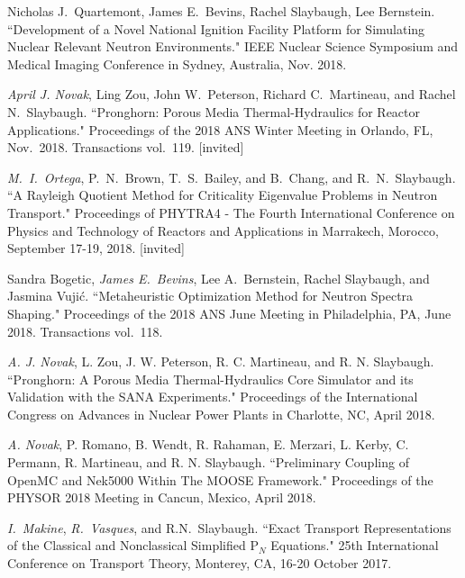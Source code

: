 \begin{bibsection}
\item Nicholas J.\ Quartemont, James E.\ Bevins, Rachel Slaybaugh, Lee Bernstein. ``Development of a Novel National Ignition Facility Platform for Simulating Nuclear Relevant Neutron Environments." IEEE Nuclear Science Symposium and Medical Imaging Conference in Sydney, Australia, Nov. 2018. 

\item \textit{April J. Novak}, Ling Zou, John W.\ Peterson, Richard C.\ Martineau, and Rachel N.\ Slaybaugh. ``Pronghorn: Porous Media Thermal-Hydraulics for Reactor Applications." Proceedings of the 2018 ANS Winter Meeting in Orlando, FL, Nov.\ 2018. Transactions vol.\ 119. [invited]

\item \textit{M.\ I.\ Ortega}, P.\ N.\ Brown, T.\ S.\ Bailey, and B.\ Chang, and R.\ N.\ Slaybaugh. ``A Rayleigh Quotient Method for Criticality Eigenvalue Problems in Neutron Transport." Proceedings of PHYTRA4 - The Fourth International Conference on Physics and Technology of Reactors and Applications in Marrakech, Morocco, September 17-19, 2018. [invited]

\item Sandra Bogetic, \textit{James E.\ Bevins}, Lee A.\ Bernstein, Rachel Slaybaugh, and Jasmina Vuji\'c. ``Metaheuristic Optimization Method for Neutron Spectra Shaping." Proceedings of the 2018 ANS June Meeting in Philadelphia, PA, June 2018. Transactions vol.\ 118. 

\item \textit{A. J. Novak}, L. Zou, J. W. Peterson, R. C. Martineau, and R. N. Slaybaugh.
``Pronghorn: A Porous Media Thermal-Hydraulics Core Simulator and its Validation with the SANA Experiments." Proceedings of the International Congress on Advances in Nuclear Power Plants in Charlotte, NC, April 2018. 

\item \textit{A. Novak}, P. Romano, B. Wendt, R. Rahaman, E. Merzari, L. Kerby, C. Permann, R. Martineau, and R. N. Slaybaugh. ``Preliminary Coupling of OpenMC and Nek5000 Within The MOOSE Framework." Proceedings of the PHYSOR 2018 Meeting in Cancun, Mexico, April 2018. 

\item  \textit{I.\ Makine}, \textit{R.\ Vasques}, and R.N.\ Slaybaugh. ``Exact Transport Representations of the Classical and Nonclassical Simplified P$_N$ Equations." 25th International Conference on Transport Theory, Monterey, CA, 16-20 October 2017.


\end{bibsection}
